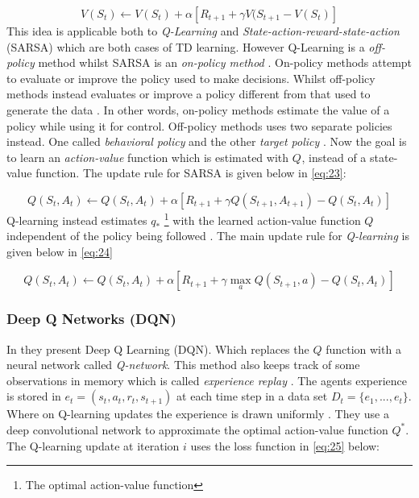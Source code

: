 \documentclass{kththesis}
\theoremstyle{definition}
\begin{document}
\begin{equation}
    \label{eq:22}
    V(S_t) \leftarrow V(S_t) + \alpha \left[R_{t+1} + \gamma V(S_{t+1} - V(S_t) \right]
\end{equation}
This idea is applicable both to \textit{Q-Learning} and \textit{State-action-reward-state-action} (SARSA) which are both cases of TD learning. 
\newline
\newline
However Q-Learning is a \textit{off-policy} method whilst SARSA is an \textit{on-policy method} \parencite{sutton1998reinforcement, arulkumaran2017brief}. On-policy methods attempt to evaluate or improve the policy used to make decisions. Whilst off-policy methods instead evaluates or improve a policy different from that used to generate the data \parencite{sutton1998reinforcement}. In other words, on-policy methods estimate the value of a policy while using it for control. Off-policy methods uses two separate policies instead. One called \textit{behavioral policy} and the other \textit{target policy} \parencite{sutton1998reinforcement}. Now the goal is to learn an \textit{action-value} function which is estimated with $Q^{}$, instead of a state-value function. The update rule for SARSA is given below in \autoref{eq:23}:

\begin{equation}
    \label{eq:23}
    Q(S_t, A_t) \leftarrow Q(S_t, A_t) + \alpha \left[R_{t+1} + \gamma Q(S_{t+1}, A_{t+1}) - Q(S_t, A_t) \right]
\end{equation}
Q-learning instead estimates  $q_{*}$ \footnote{The optimal action-value function} with the learned action-value function $Q$ independent of the policy being followed \parencite{sutton1998reinforcement}. 
The main update rule for \textit{Q-learning} is given below in \autoref{eq:24}

\begin{equation}
    \label{eq:24}
     Q(S_t, A_t) \leftarrow Q(S_t, A_t) + \alpha \left[R_{t+1} + \gamma \underset{a}{\operatorname{max}} Q(S_{t+1}, a) - Q(S_t, A_t) \right]
\end{equation}

\subsubsection*{Deep Q Networks (DQN)}
In \textcite{mnih2015human} they present Deep Q Learning (DQN). Which replaces the $Q$ function with a neural network called \textit{Q-network}. This method also keeps track of some observations in memory which is called \textit{experience replay} \parencite{mnih2015human}. The agents experience is stored in $e_t = (s_t, a_t, r_t, s_{t+1})$ at each time step in a data set $D_t = \{e_1, ..., e_t\}$. Where on Q-learning updates the experience is drawn uniformly \parencite{mnih2015human}. They use a deep convolutional network to approximate the optimal action-value function $Q^{*}$. The Q-learning update at iteration $i$ uses the loss function in \autoref{eq:25} below:
\end{document}

